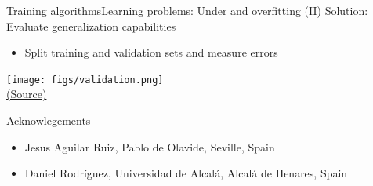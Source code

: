 \documentclass[10pt,compress]{beamer} %
\begin{document}
\begin{frame}{Training algorithms}{Learning problems: Under and overfitting (II)}
       Solution: Evaluate generalization capabilities
            \begin{itemize}
                \item Split training and validation sets and measure errors
            \end{itemize}

            \begin{center}
			\texttt{[image: figs/validation.png]}\\
			\scriptsize \href{https://datascience.stackexchange.com/questions/61/why-is-overfitting-bad-in-machine-learning}{(Source)}
            \end{center}
\end{frame}

\begin{frame}{Acknowlegements}
	\begin{itemize}
		\item Jesus Aguilar Ruiz, Pablo de Olavide, Seville, Spain
		\item Daniel Rodr\'iguez, Universidad de Alcal\'a, Alcal\'a de Henares, Spain
	\end{itemize}
\end{frame}
\end{document}
